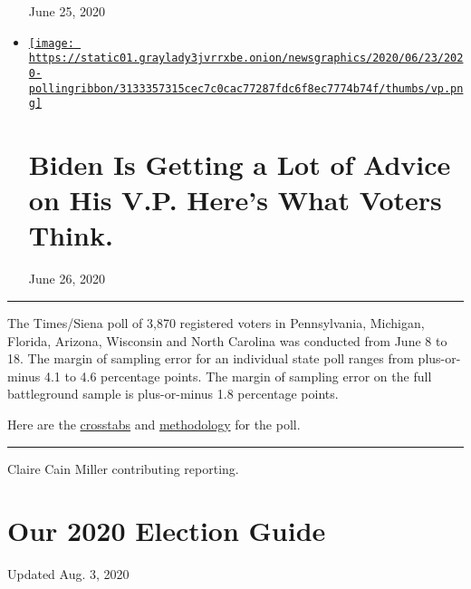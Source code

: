 \begin{itemize}
  June 25, 2020
\item
  \href{https://www.nytimes3xbfgragh.onion/2020/06/26/us/politics/biden-vice-president-voters.html}{\texttt{[image: https://static01.graylady3jvrrxbe.onion/newsgraphics/2020/06/23/2020-pollingribbon/3133357315cec7c0cac77287fdc6f8ec7774b74f/thumbs/vp.png]}}

  \href{https://www.nytimes3xbfgragh.onion/2020/06/26/us/politics/biden-vice-president-voters.html}{}

  \hypertarget{biden-is-getting-a-lot-of-advice-on-his-vp-heres-what-voters-think}{%
  \section{Biden Is Getting a Lot of Advice on His V.P. Here's What
  Voters
  Think.}\label{biden-is-getting-a-lot-of-advice-on-his-vp-heres-what-voters-think}}

  June 26, 2020
\end{itemize}

\begin{center}\rule{0.5\linewidth}{\linethickness}\end{center}

The Times/Siena poll of 3,870 registered voters in Pennsylvania,
Michigan, Florida, Arizona, Wisconsin and North Carolina was conducted
from June 8 to 18. The margin of sampling error for an individual state
poll ranges from plus-or-minus 4.1 to 4.6 percentage points. The margin
of sampling error on the full battleground sample is plus-or-minus 1.8
percentage points.

Here are the
\href{https://int.graylady3jvrrxbe.onion/data/documenttools/battleground-0625/6ca076db1919b722/full.pdf}{crosstabs}
and
\href{https://int.graylady3jvrrxbe.onion/data/documenttools/nyt-siena-poll-methodology-june-2020/f6f533b4d07f4cbe/full.pdf}{methodology}
for the poll.

\begin{center}\rule{0.5\linewidth}{\linethickness}\end{center}

Claire Cain Miller contributing reporting.

\hypertarget{our-2020-election-guide}{%
\section{Our 2020 Election Guide}\label{our-2020-election-guide}}

Updated Aug. 3, 2020

